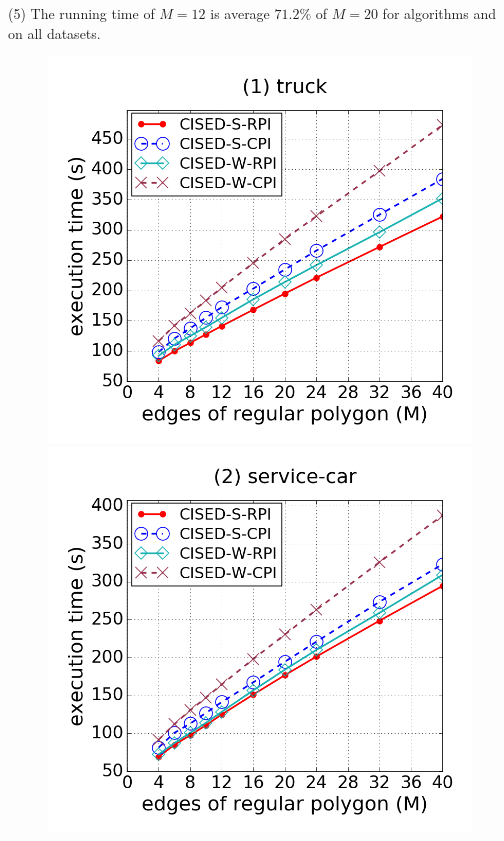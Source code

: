 \ni(5) The running time of $M=12$ is average {$71.2\%$} of $M=20$ for algorithms \cist and \cista on all datasets.






\begin{figure}[tb!]
\centering
\includegraphics[scale = 0.250]{figures/Exp-M-e-60-time-truck.png}
\includegraphics[scale = 0.250]{figures/Exp-M-e-60-time-service.png}

\end{figure}
